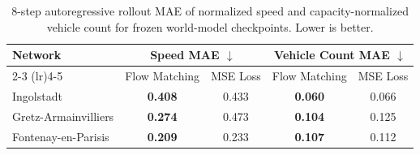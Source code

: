 \begin{table}[t]
  \centering
  \caption{8-step autoregressive rollout MAE of normalized speed and capacity-normalized vehicle count for frozen world-model checkpoints. Lower is better.}
  \renewcommand{\arraystretch}{1.0}
  \scriptsize
  \setlength{\tabcolsep}{4pt}
    \begin{tabular}{lcccc}
      \toprule
      \multirow{2}{*}{Network} & \multicolumn{2}{c}{Speed MAE $\downarrow$} & \multicolumn{2}{c}{Vehicle Count MAE $\downarrow$} \\
      \cmidrule(lr){2-3} \cmidrule(lr){4-5}
      & Flow Matching & MSE Loss & Flow Matching & MSE Loss \\
      \midrule
      Ingolstadt & \textbf{0.408} & 0.433 & \textbf{0.060} & 0.066 \\
      Gretz-Armainvilliers & \textbf{0.274} & 0.473 & \textbf{0.104} & 0.125 \\
      Fontenay-en-Parisis & \textbf{0.209} & 0.233 & \textbf{0.107} & 0.112 \\
      \bottomrule
    \end{tabular}
  \label{tab:wm-prediction-ablation}
\end{table}
